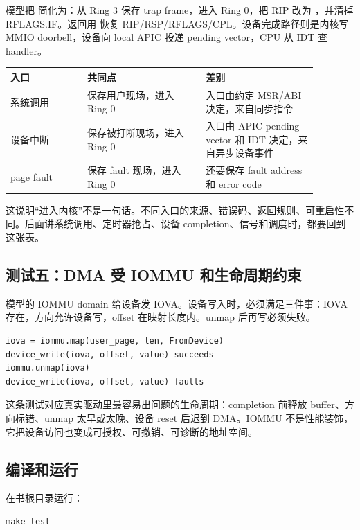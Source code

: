 模型把  简化为：从 Ring 3 保存 trap frame，进入 Ring 0，把 RIP 改为 ，并清掉 RFLAGS.IF。返回用  恢复 RIP/RSP/RFLAGS/CPL。设备完成路径则是内核写 MMIO doorbell，设备向 local APIC 投递 pending vector，CPU 从 IDT 查 handler。

\begin{longtable}{p{0.22\linewidth}p{0.34\linewidth}p{0.32\linewidth}}
\toprule
入口 & 共同点 & 差别 \\
\midrule
系统调用 & 保存用户现场，进入 Ring 0 & 入口由约定 MSR/ABI 决定，来自同步指令 \\
设备中断 & 保存被打断现场，进入 Ring 0 & 入口由 APIC pending vector 和 IDT 决定，来自异步设备事件 \\
page fault & 保存 fault 现场，进入 Ring 0 & 还要保存 fault address 和 error code \\
\bottomrule
\end{longtable}

这说明“进入内核”不是一句话。不同入口的来源、错误码、返回规则、可重启性不同。后面讲系统调用、定时器抢占、设备 completion、信号和调度时，都要回到这张表。

\subsection{测试五：DMA 受 IOMMU 和生命周期约束}

模型的 IOMMU domain 给设备发 IOVA。设备写入时，必须满足三件事：IOVA 存在，方向允许设备写，offset 在映射长度内。unmap 后再写必须失败。

\begin{lstlisting}
iova = iommu.map(user_page, len, FromDevice)
device_write(iova, offset, value) succeeds
iommu.unmap(iova)
device_write(iova, offset, value) faults
\end{lstlisting}

这条测试对应真实驱动里最容易出问题的生命周期：completion 前释放 buffer、方向标错、unmap 太早或太晚、设备 reset 后迟到 DMA。IOMMU 不是性能装饰，它把设备访问也变成可授权、可撤销、可诊断的地址空间。

\subsection{编译和运行}

在书根目录运行：

\begin{lstlisting}
make test
\end{lstlisting}

